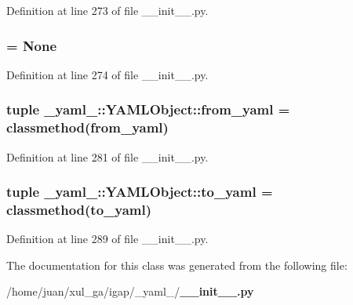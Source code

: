 Definition at line 273 of file \_\-\_\-init\_\-\_\-.py.
\subsubsection{ = None\hspace{0.3cm}{\tt  [static]}}\label{class__yaml___1_1YAMLObject_12c4d8e28726d6d31536976558d24673}




Definition at line 274 of file \_\-\_\-init\_\-\_\-.py.
\subsubsection{\setlength{\rightskip}{0pt plus 5cm}tuple {\bf \_\-yaml\_\-::YAMLObject::from\_\-yaml} = classmethod({\bf from\_\-yaml})\hspace{0.3cm}{\tt  [static]}}\label{class__yaml___1_1YAMLObject_8fa076d49f97f15b505b69656eb20802}




Definition at line 281 of file \_\-\_\-init\_\-\_\-.py.
\subsubsection{\setlength{\rightskip}{0pt plus 5cm}tuple {\bf \_\-yaml\_\-::YAMLObject::to\_\-yaml} = classmethod({\bf to\_\-yaml})\hspace{0.3cm}{\tt  [static]}}\label{class__yaml___1_1YAMLObject_e4fa12d41ad07ee48bd1da9921c6ba21}




Definition at line 289 of file \_\-\_\-init\_\-\_\-.py.

The documentation for this class was generated from the following file:\begin{CompactItemize}
\item 
/home/juan/xul\_\-ga/igap/\_\-yaml\_\-/{\bf \_\-\_\-init\_\-\_\-.py}\end{CompactItemize}
